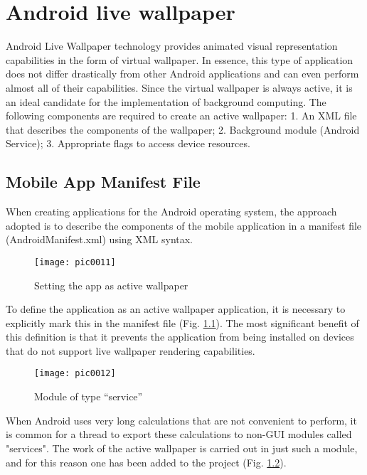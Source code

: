 \newpage
\chapter{Android live wallpaper}
\label{chapter04}

Android Live Wallpaper technology provides animated visual representation capabilities in the form of virtual wallpaper. In essence, this type of application does not differ drastically from other Android applications and can even perform almost all of their capabilities. Since the virtual wallpaper is always active, it is an ideal candidate for the implementation of background computing. The following components are required to create an active wallpaper: 1. An XML file that describes the components of the wallpaper; 2. Background module (Android Service); 3. Appropriate flags to access device resources.

\section{Mobile App Manifest File}

When creating applications for the Android operating system, the approach adopted is to describe the components of the mobile application in a manifest file (AndroidManifest.xml) using XML syntax.

\begin{figure}[h]
\centering
\texttt{[image: pic0011]}
\caption{Setting the app as active wallpaper}
\label{fig:pic0011}
\end{figure}
\FloatBarrier

To define the application as an active wallpaper application, it is necessary to explicitly mark this in the manifest file (Fig. \ref{fig:pic0011}). The most significant benefit of this definition is that it prevents the application from being installed on devices that do not support live wallpaper rendering capabilities.

\begin{figure}[h]
\centering
\texttt{[image: pic0012]}
\caption{Module of type ``service''}
\label{fig:pic0012}
\end{figure}
\FloatBarrier

When Android uses very long calculations that are not convenient to perform, it is common for a thread to export these calculations to non-GUI modules called "services". The work of the active wallpaper is carried out in just such a module, and for this reason one has been added to the project (Fig. \ref{fig:pic0012}).

